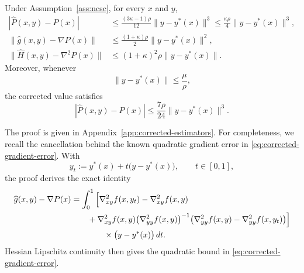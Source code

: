 \begin{lemma}
\label{lem:corrected-errors}
Under Assumption~\ref{ass:ncsc}, for every $x$ and $y$,
\begin{subequations}
\label{eq:corrected-error-bounds}
\begin{align}
    |\widehat P(x,y)-P(x)|
    &\le
    \frac{(3\kappa-1)\rho}{12}
    \|y-y^*(x)\|^3
    \le
    \frac{\kappa\rho}{4}
    \|y-y^*(x)\|^3,
    \label{eq:corrected-value-error}
    \\
    \|\widehat g(x,y)-\nabla P(x)\|
    &\le
    \frac{(1+\kappa)\rho}{2}
    \|y-y^*(x)\|^2,
    \label{eq:corrected-gradient-error}
    \\
    \|\widehat H(x,y)-\nabla^2P(x)\|
    &\le
    (1+\kappa)^2\rho
    \|y-y^*(x)\|.
    \label{eq:corrected-hessian-error}
\end{align}
\end{subequations}
Moreover, whenever
\begin{equation}
    \|y-y^*(x)\|\le\frac{\mu}{\rho},
    \label{eq:corrected-value-local-region}
\end{equation}
the corrected value satisfies
\begin{equation}
    |\widehat P(x,y)-P(x)|
    \le
    \frac{7\rho}{24}\|y-y^*(x)\|^3.
    \label{eq:corrected-value-local-error}
\end{equation}
\end{lemma}

The proof is given in
Appendix~\ref{app:corrected-estimators}.
For completeness, we recall the cancellation behind the known
quadratic gradient error in \eqref{eq:corrected-gradient-error}.
With
\[
    y_t:=y^*(x)+t\bigl(y-y^*(x)\bigr),
    \qquad t\in[0,1],
\]
the proof derives the exact identity
\begin{align}
    \widehat g(x,y)-\nabla P(x)
    &=
    \int_0^1
    \Big[
        \nabla^2_{xy}f(x,y_t)-\nabla^2_{xy}f(x,y)
        \notag\\
    &\qquad
        +
        \nabla^2_{xy}f(x,y)
        \bigl(\nabla^2_{yy}f(x,y)\bigr)^{-1}
        \bigl(
            \nabla^2_{yy}f(x,y)
            -
            \nabla^2_{yy}f(x,y_t)
        \bigr)
    \Big]
    \notag\\
    &\qquad\qquad\times
    \bigl(y-y^*(x)\bigr)\,dt.
    \label{eq:corrected-gradient-cancellation}
\end{align}
Hessian Lipschitz continuity then gives the quadratic bound in
\eqref{eq:corrected-gradient-error}.

